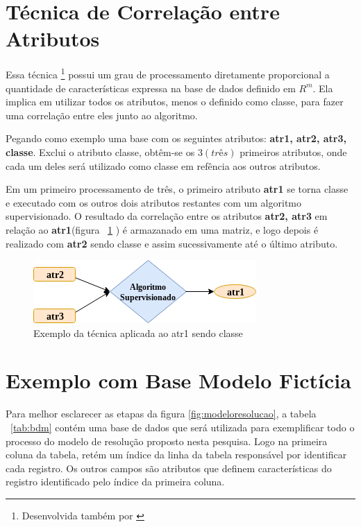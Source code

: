 \section{Técnica de Correlação entre Atributos }\label{cap:ferramentas:sec:tecnica}

Essa técnica \footnote{Desenvolvida também por \cite{Lopes}} possui um grau de processamento diretamente proporcional a quantidade de características expressa na base de dados definido em ${R^m}$. Ela implica em utilizar todos os atributos, menos o definido como classe, para fazer uma correlação entre eles junto ao algoritmo.


Pegando como exemplo uma base com os seguintes atributos: \textbf{atr1, atr2, atr3, classe}. Exclui o atributo classe, obtêm-se os ${3 (três)}$ primeiros atributos, onde cada um deles será utilizado como classe em refência aos outros atributos. 

Em um primeiro processamento de três, o primeiro atributo \textbf{atr1} se torna classe e executado com os outros dois atributos restantes com um algoritmo supervisionado. O resultado da correlação entre os atributos \textbf{atr2, atr3} em relação ao \textbf{atr1}(figura ~\ref{fig:tecnicamodelo} ) é armazanado em uma matriz, e logo depois é realizado com \textbf{atr2} sendo classe e assim sucessivamente até o último atributo.


\begin{figure}[h!]
        \centering
        \includegraphics[scale=0.7]{figs/tecnicamodelo.png}
        \caption{Exemplo da técnica aplicada ao atr1 sendo classe } \label{fig:tecnicamodelo}
\end{figure}


\section{Exemplo com Base Modelo Fictícia} \label{cap:ferramentas:sec:exebasemodfic}

Para melhor esclarecer as etapas da figura \ref{fig:modeloresolucao}, a tabela ~\ref{tab:bdm} contém uma base de dados que será utilizada para exemplificar todo o processo do modelo de resolução proposto nesta pesquisa. Logo na primeira coluna da tabela, retém um índice da linha da tabela responsável por identificar cada registro. Os outros campos são atributos que definem características do registro identificado pelo índice da primeira coluna.

